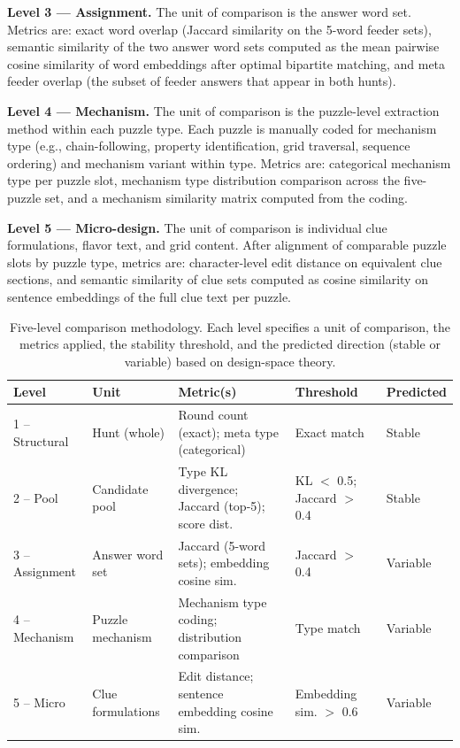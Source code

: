 \textbf{Level 3 --- Assignment.} The unit of comparison is the answer word set. Metrics are: exact word overlap (Jaccard similarity on the 5-word feeder sets), semantic similarity of the two answer word sets computed as the mean pairwise cosine similarity of word embeddings after optimal bipartite matching, and meta feeder overlap (the subset of feeder answers that appear in both hunts).

\textbf{Level 4 --- Mechanism.} The unit of comparison is the puzzle-level extraction method within each puzzle type. Each puzzle is manually coded for mechanism type (e.g., chain-following, property identification, grid traversal, sequence ordering) and mechanism variant within type. Metrics are: categorical mechanism type per puzzle slot, mechanism type distribution comparison across the five-puzzle set, and a mechanism similarity matrix computed from the coding.

\textbf{Level 5 --- Micro-design.} The unit of comparison is individual clue formulations, flavor text, and grid content. After alignment of comparable puzzle slots by puzzle type, metrics are: character-level edit distance on equivalent clue sections, and semantic similarity of clue sets computed as cosine similarity on sentence embeddings of the full clue text per puzzle.

\begin{table}[h]
\centering
\caption{Five-level comparison methodology. Each level specifies a unit of comparison, the metrics applied, the stability threshold, and the predicted direction (stable or variable) based on design-space theory.}
\label{tab:comparison-methodology}
\small
\begin{tabular}{lllll}
\toprule
\textbf{Level} & \textbf{Unit} & \textbf{Metric(s)} & \textbf{Threshold} & \textbf{Predicted} \\
\midrule
1 -- Structural & Hunt (whole) & Round count (exact); meta type (categorical) & Exact match & Stable \\
2 -- Pool & Candidate pool & Type KL divergence; Jaccard (top-5); score dist. & KL $<$ 0.5; Jaccard $>$ 0.4 & Stable \\
3 -- Assignment & Answer word set & Jaccard (5-word sets); embedding cosine sim. & Jaccard $>$ 0.4 & Variable \\
4 -- Mechanism & Puzzle mechanism & Mechanism type coding; distribution comparison & Type match & Variable \\
5 -- Micro & Clue formulations & Edit distance; sentence embedding cosine sim. & Embedding sim. $>$ 0.6 & Variable \\
\bottomrule
\end{tabular}
\end{table}


